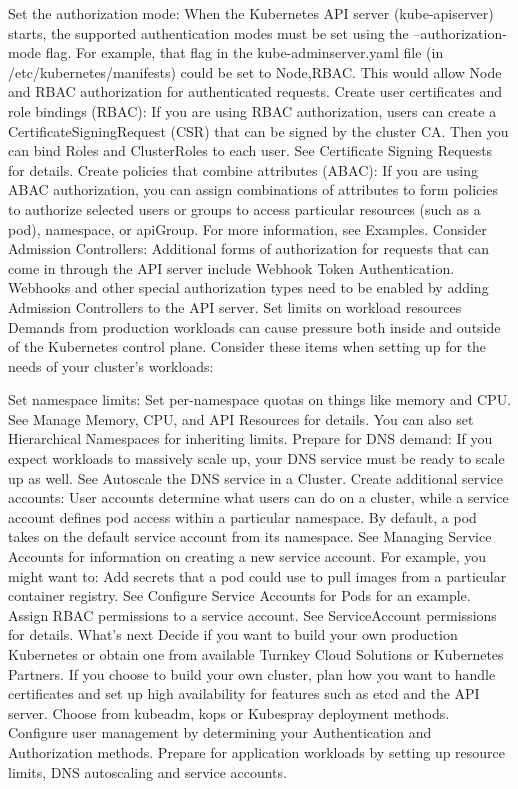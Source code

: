 Set the authorization mode: When the Kubernetes API server (kube-apiserver) starts, the supported authentication modes must be set using the --authorization-mode flag. For example, that flag in the kube-adminserver.yaml file (in /etc/kubernetes/manifests) could be set to Node,RBAC. This would allow Node and RBAC authorization for authenticated requests.
Create user certificates and role bindings (RBAC): If you are using RBAC authorization, users can create a CertificateSigningRequest (CSR) that can be signed by the cluster CA. Then you can bind Roles and ClusterRoles to each user. See Certificate Signing Requests for details.
Create policies that combine attributes (ABAC): If you are using ABAC authorization, you can assign combinations of attributes to form policies to authorize selected users or groups to access particular resources (such as a pod), namespace, or apiGroup. For more information, see Examples.
Consider Admission Controllers: Additional forms of authorization for requests that can come in through the API server include Webhook Token Authentication. Webhooks and other special authorization types need to be enabled by adding Admission Controllers to the API server.
Set limits on workload resources
Demands from production workloads can cause pressure both inside and outside of the Kubernetes control plane. Consider these items when setting up for the needs of your cluster's workloads:

Set namespace limits: Set per-namespace quotas on things like memory and CPU. See Manage Memory, CPU, and API Resources for details. You can also set Hierarchical Namespaces for inheriting limits.
Prepare for DNS demand: If you expect workloads to massively scale up, your DNS service must be ready to scale up as well. See Autoscale the DNS service in a Cluster.
Create additional service accounts: User accounts determine what users can do on a cluster, while a service account defines pod access within a particular namespace. By default, a pod takes on the default service account from its namespace. See Managing Service Accounts for information on creating a new service account. For example, you might want to:
Add secrets that a pod could use to pull images from a particular container registry. See Configure Service Accounts for Pods for an example.
Assign RBAC permissions to a service account. See ServiceAccount permissions for details.
What's next
Decide if you want to build your own production Kubernetes or obtain one from available Turnkey Cloud Solutions or Kubernetes Partners.
If you choose to build your own cluster, plan how you want to handle certificates and set up high availability for features such as etcd and the API server.
Choose from kubeadm, kops or Kubespray deployment methods.
Configure user management by determining your Authentication and Authorization methods.
Prepare for application workloads by setting up resource limits, DNS autoscaling and service accounts.

